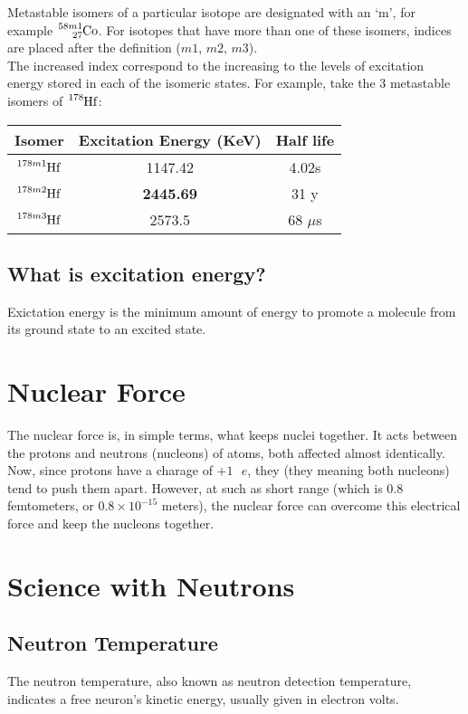 \documentclass{article}
\begin{document}
\begin{multicols*}{2}
    Metastable isomers of a particular isotope are designated with an `m',
    for example $\ce{^{58m1}_{27}Co}$. For isotopes that have more than one
    of these isomers, indices are placed after the definition ($m1$, $m2$,
    $m3$).\\

    The increased index correspond to the increasing to the levels of excitation
    energy stored in each of the isomeric states. For example, take the $3$
    metastable isomers of $\ce{^{178}Hf}$:\\

    \begin{tabular}{|c|c|c|}
      \hline
      Isomer & Excitation Energy (KeV) & Half life \\
      \hline
      $\ce{^{178m1}Hf}$ & 1147.42 & 4.02s \\
      $\ce{^{178m2}Hf}$ & \textbf{2445.69} & 31 y \\
      $\ce{^{178m3}Hf}$ & 2573.5 & 68 $\mu$s \\
      \hline
    \end{tabular}

    \subsection{What is excitation energy?}
    Exictation energy is the minimum amount of energy to promote a molecule
    from its ground state to an excited state.


    \section{Nuclear Force}
    The nuclear force is, in simple terms, what keeps nuclei together. It
    acts between the protons and neutrons (nucleons) of atoms, both affected
    almost identically.\\

    Now, since protons have a charage of $+1\text{ }e$, they (they meaning
    both nucleons) tend to push them apart. However, at such as short range
    (which is $0.8$ femtometers, or $0.8 \times 10^{-15}$ meters), the nuclear
    force can overcome this electrical force and keep the nucleons together.

    \section{Science with Neutrons}

    \subsection{Neutron Temperature}
    The neutron temperature, also known as neutron detection temperature,
    indicates a free neuron's kinetic energy, usually given in electron volts.\\
    

\end{multicols*}
\end{document}
